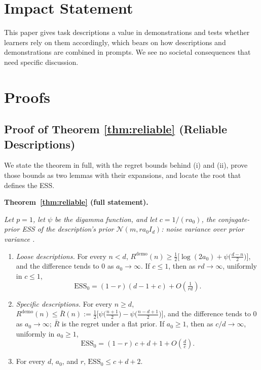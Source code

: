 \documentclass{article}
\newcommand{\ess}{\mathrm{ESS}}
\begin{document}
\section*{Impact Statement}
This paper gives task descriptions a value in demonstrations and tests whether learners rely on them accordingly, which bears on how descriptions and demonstrations are combined in prompts. We see no societal consequences that need specific discussion.




\clearpage
\onecolumn
\appendix
\section{Proofs}

\subsection{Proof of Theorem \ref{thm:reliable} (Reliable Descriptions)}\label{app:specificity}
We state the theorem in full, with the regret bounds behind (i) and (ii), prove those bounds as two lemmas with their expansions, and locate the root that defines the ESS.

\medskip\noindent\textbf{Theorem~\ref{thm:reliable} (full statement).} {\itshape Let $p = 1$, let $\psi$ be the digamma function, and let $c = 1/(r a_0)$, the conjugate-prior ESS of the description's prior $\mathcal{N}(m, r a_0 I_d)$: noise variance over prior variance \citep{neuenschwander2020}.
\begin{enumerate}
\item[(i)] \emph{Loose descriptions.} For every $n < d$,
$R^{\mathrm{demo}}(n) \ge \tfrac12\big[\log(2a_0) + \psi\big(\tfrac{d-n}{2}\big)\big]$, and the difference tends to $0$ as $a_0 \to \infty$. If $c \le 1$, then as $rd \to \infty$, uniformly in $c \le 1$,
\[
\ess_0 = (1-r)(d-1+c) + O\!\left(\tfrac{1}{rd}\right).
\]
\item[(ii)] \emph{Specific descriptions.} For every $n \ge d$,
$R^{\mathrm{demo}}(n) \le \bar R(n) := \tfrac12\big[\psi\big(\tfrac{n+1}{2}\big) - \psi\big(\tfrac{n-d+1}{2}\big)\big]$, and the difference tends to $0$ as $a_0 \to \infty$; $\bar R$ is the regret under a flat prior. If $a_0 \ge 1$, then as $c/d \to \infty$, uniformly in $a_0 \ge 1$,
\[
\ess_0 = (1-r)\,c + d + 1 + O\!\left(\tfrac{d}{c}\right).
\]
\item[(iii)] For every $d$, $a_0$, and $r$, $\ess_0 \le c + d + 2$.
\end{enumerate}}
\medskip
\end{document}
